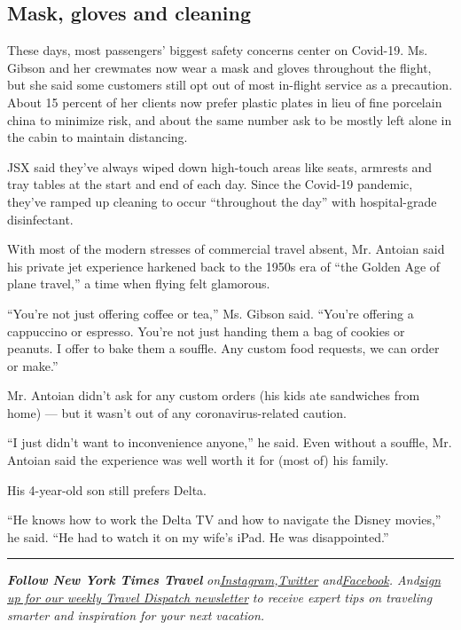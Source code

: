 \hypertarget{mask-gloves-and-cleaning}{%
\subsection{Mask, gloves and cleaning}\label{mask-gloves-and-cleaning}}

These days, most passengers' biggest safety concerns center on Covid-19.
Ms. Gibson and her crewmates now wear a mask and gloves throughout the
flight, but she said some customers still opt out of most in-flight
service as a precaution. About 15 percent of her clients now prefer
plastic plates in lieu of fine porcelain china to minimize risk, and
about the same number ask to be mostly left alone in the cabin to
maintain distancing.

JSX said they've always wiped down high-touch areas like seats, armrests
and tray tables at the start and end of each day. Since the Covid-19
pandemic, they've ramped up cleaning to occur ``throughout the day''
with hospital-grade disinfectant.

With most of the modern stresses of commercial travel absent, Mr.
Antoian said his private jet experience harkened back to the 1950s era
of ``the Golden Age of plane travel,'' a time when flying felt
glamorous.

``You're not just offering coffee or tea,'' Ms. Gibson said. ``You're
offering a cappuccino or espresso. You're not just handing them a bag of
cookies or peanuts. I offer to bake them a souffle. Any custom food
requests, we can order or make.''

Mr. Antoian didn't ask for any custom orders (his kids ate sandwiches
from home) --- but it wasn't out of any coronavirus-related caution.

``I just didn't want to inconvenience anyone,'' he said. Even without a
souffle, Mr. Antoian said the experience was well worth it for (most of)
his family.

His 4-year-old son still prefers Delta.

``He knows how to work the Delta TV and how to navigate the Disney
movies,'' he said. ``He had to watch it on my wife's iPad. He was
disappointed.''

\begin{center}\rule{0.5\linewidth}{\linethickness}\end{center}

\emph{\textbf{Follow New York Times Travel}}
\emph{on}\href{https://www.instagram.com/nytimestravel/}{\emph{Instagram}}\emph{,}\href{https://twitter.com/nytimestravel}{\emph{Twitter}}
\emph{and}\href{https://www.facebookcorewwwi.onion/nytimestravel/}{\emph{Facebook}}\emph{.
And}\href{https://www.nytimes3xbfgragh.onion/newsletters/traveldispatch}{\emph{sign
up for our weekly Travel Dispatch newsletter}} \emph{to receive expert
tips on traveling smarter and inspiration for your next vacation.}

